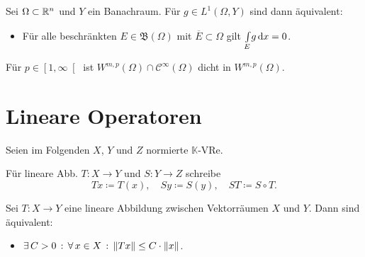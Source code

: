 \documentclass{cheat-sheet}
\newcommand{\K}{\mathbb{K}}
\newcommand{\Bor}{\mathfrak{B}} %
\begin{document}
\begin{samepage}

\begin{satz}
  Sei $\Omega \subset \mathbb{R}^n$ und $Y$ ein Banachraum. Für $g \in L^1(\Omega, Y)$ sind dann äquivalent:
  \begin{itemize}
    \item Für alle beschränkten $E \in \Bor(\Omega)$ mit $\overline{E} \subset \Omega$ gilt ${\textstyle \int\limits_{E}^{}} g \,\mathrm{d} x = 0$.
  \end{itemize}
\end{satz}

\begin{lem}
  Für $p \in \left[ 1, \infty \right[$ ist $W^{m,p}(\Omega) \cap \mathcal{C}^\infty(\Omega)$ dicht in $W^{m,p}(\Omega)$.
\end{lem}

\section{Lineare Operatoren}

\end{samepage}

\begin{nota}
  Seien im Folgenden $X$, $Y$ und $Z$ normierte $\K$-VRe.
\end{nota}

\begin{nota}
  Für lineare Abb. $T : X \to Y$ und $S : Y \to Z$ schreibe
  \[ Tx \coloneqq T(x), \quad Sy \coloneqq S(y), \quad ST \coloneqq S \circ T. \]
\end{nota}

\begin{satz}
  Sei $T : X \to Y$ eine lineare Abbildung zwischen Vektorräumen $X$ und $Y$. Dann sind äquivalent:
  \begin{itemize}
    \item $\exists \, {C > 0} \,:\, \forall \, {x \in X} \,:\, \lVert Tx\rVert \leq C \cdot \lVert x\rVert$.
  \end{itemize}
  \vspace{-8pt}
  \begin{itemize}
  \end{itemize}
\end{satz}
\end{document}

